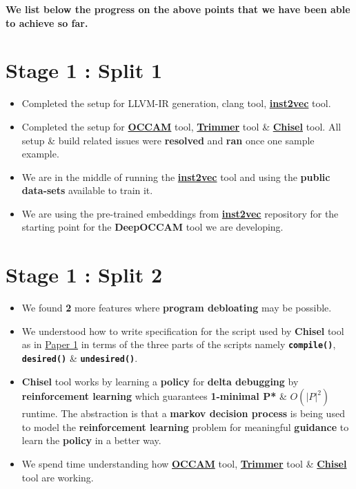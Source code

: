 \documentclass{article} %
\begin{document}
\textbf{\color{azure(colorwheel)} We list below the progress on the above points that we have been able to achieve so far.}

\section*{\color{darkmidnightblue} Stage 1 : Split 1} 
\begin{itemize}
    \item Completed the setup for LLVM-IR generation, clang tool, \textbf{\href{https://github.com/lahiri-phdworks/ncc}{inst2vec}} tool. 
    \item Completed the setup for \textbf{\href{https://github.com/ashish-gehani/OCCAM}{OCCAM}} tool, \textbf{\href{http://www.csl.sri.com/users/gehani/papers/ASE-2018.Trimmer.pdf}{Trimmer}} tool \& \textbf{\href{https://github.com/aspire-project/chisel}{Chisel}} tool. All setup \& build related issues were \textbf{\color{ao(english)}resolved} and \textbf{\color{ao(english)}ran} once one sample example.
	\item We are in the middle of running the \textbf{\href{https://github.com/lahiri-phdworks/ncc}{inst2vec}} tool and using the \textbf{public data-sets} available to train it. 
	\item We are using the pre-trained embeddings from \textbf{\href{https://github.com/lahiri-phdworks/ncc}{inst2vec}} repository for the starting point for the \textbf{DeepOCCAM} tool we are developing.
\end{itemize}

\section*{\color{darkmidnightblue} Stage 1 : Split 2}
\begin{itemize}
	\item We found \textbf{2} more features where \textbf{program debloating} may be possible. 
	\item We understood how to write specification for the script used by \textbf{Chisel} tool as in \href{https://dl.acm.org/doi/10.1145/3243734.3243838}{Paper 1} in terms of the three parts of the scripts namely \textbf{\texttt{compile()}}, \textbf{\texttt{desired()}} \& \texttt{\textbf{undesired()}}.
	\item \textbf{Chisel} tool works by learning a \textbf{policy} for \textbf{delta debugging} by \textbf{reinforcement learning} which guarantees \textbf{1-minimal P*} \& $\textbf{$O(|P|^2)$}$ runtime. The abstraction is that a \textbf{markov decision process} is being used to model the \textbf{reinforcement learning} problem for meaningful \textbf{guidance} to learn the \textbf{policy} in a better way.
	\item We spend time understanding how \textbf{\href{https://github.com/ashish-gehani/OCCAM}{OCCAM}} tool, \textbf{\href{http://www.csl.sri.com/users/gehani/papers/ASE-2018.Trimmer.pdf}{Trimmer}} tool \& \textbf{\href{https://github.com/aspire-project/chisel}{Chisel}} tool are working.
\end{itemize}
\end{document}
